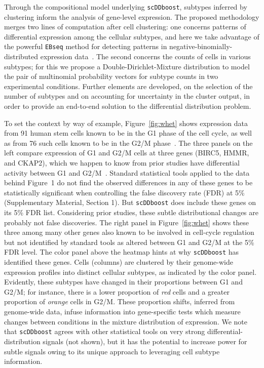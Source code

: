 \documentclass[aoas,preprint]{imsart}
\begin{document}
Through the compositional model underlying \verb+scDDboost+, subtypes inferred by clustering 
inform the analysis of gene-level expression.  The proposed methodology merges two lines of computation
after cell clustering: one concerns patterns of differential expression among 
the cellular subtypes, and here we take advantage of the powerful \verb+EBseq+ method for detecting
patterns in negative-binomially-distributed expression data~\citep{ref:Leng}.  The second concerns 
the counts of cells in various subtypes; for this we propose a Double-Dirichlet-Mixture distribution
to model the pair of multinomial probability vectors for subtype counts in two experimental conditions.
Further elements are developed, on the selection of the number of subtypes and on accounting for uncertainty in the cluster output,  in order to provide an end-to-end solution to the differential distribution
problem.  

To set the context by way of example, 
Figure~\ref{fig:whet} shows expression data from 91 human 
stem cells known to be in the G1 phase of the cell cycle, as well as
from 76 such cells known to be in the G2/M phase~\citep{ref:Leng}.  The three panels on the left compare expression of G1
and G2/M cells at three genes (BIRC5, HMMR, and CKAP2),  which we happen to know from prior studies  have differential activity between G1 and G2/M~\citep{BIRC5,HMMR,RAD21}.  
Standard statistical tools applied to the data behind Figure~1 do not find the observed
 differences in any of these genes
to be statistically significant when controlling the false discovery rate (FDR) at 5\% (Supplementary Material, 
Section 1).  But \verb+scDDboost+ does include these genes on its 5\% FDR list.
Considering prior studies, these subtle distributional changes are probably not false discoveries.
The right panel in Figure~\ref{fig:whet} shows these three among
  many other genes also known to be involved in cell-cycle regulation but
not identified by standard tools as altered between G1 and G2/M at the 5\% FDR level.    The color panel above the
heatmap hints at why \verb+scDDboost+ has identified these genes. Cells (columns) are clustered by their genome-wide
expression profiles into distinct cellular subtypes, as indicated by the color panel.   Evidently, these 
subtypes have changed in their proportions between G1 and G2/M; for instance, there is a lower proportion
 of {\em red} cells   and a greater proportion of {\em orange} cells in G2/M. These proportion shifts, 
inferred from genome-wide data, infuse information into gene-specific tests which measure 
changes between conditions in the mixture distribution of expression.  We note that \verb+scDDboost+ 
agrees with other statistical tools on very strong differential-distribution signals (not shown), but it 
has the potential to increase power for subtle signals owing to its unique approach to leveraging cell subtype
information.
\end{document}
